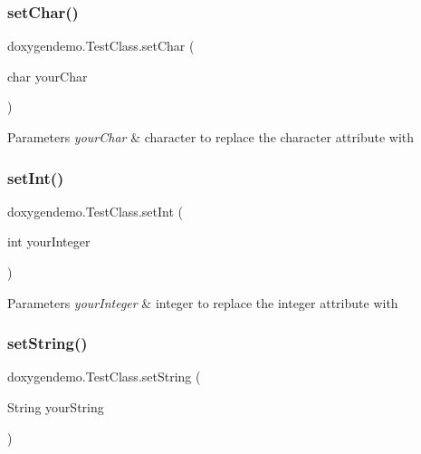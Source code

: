\subsubsection{\texorpdfstring{set\+Char()}{setChar()}}
{\footnotesize\ttfamily doxygendemo.\+Test\+Class.\+set\+Char (\begin{DoxyParamCaption}\item[{char}]{your\+Char }\end{DoxyParamCaption})}


\begin{DoxyParams}{Parameters}
{\em your\+Char} & character to replace the character attribute with \\
\hline
\end{DoxyParams}
\mbox{\label{classdoxygendemo_1_1_test_class_ac478dea45796d1b1dc1acf230c8d4263}} 
\subsubsection{\texorpdfstring{set\+Int()}{setInt()}}
{\footnotesize\ttfamily doxygendemo.\+Test\+Class.\+set\+Int (\begin{DoxyParamCaption}\item[{int}]{your\+Integer }\end{DoxyParamCaption})}


\begin{DoxyParams}{Parameters}
{\em your\+Integer} & integer to replace the integer attribute with \\
\hline
\end{DoxyParams}
\mbox{\label{classdoxygendemo_1_1_test_class_a0da9db140c2b9cad94632c4a2f8a1081}} 
\subsubsection{\texorpdfstring{set\+String()}{setString()}}
{\footnotesize\ttfamily doxygendemo.\+Test\+Class.\+set\+String (\begin{DoxyParamCaption}\item[{String}]{your\+String }\end{DoxyParamCaption})}


